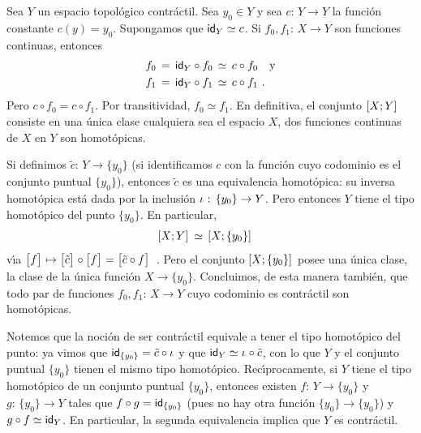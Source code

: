 \begin{obsEnContractilSonHomotopicos}\label{obs:encontractilsonhomotopicos}
	Sea $Y$ un espacio topol\'{o}gico contr\'{a}ctil. Sea $y_{0}\in Y$
	y sea $c:\,Y\rightarrow Y$ la funci\'{o}n constante $c(y)=y_{0}$.
	Supongamos que $\id[Y]\simeq c$. Si $f_{0},f_{1}:\,X\rightarrow Y$
	son funciones continuas, entonces
	\begin{align*}
		f_{0} & \,=\,\id[Y]\circ f_{0} \,\simeq\,c\circ f_{0}
			\quad\text{y} \\
		f_{1} & \,=\,\id[Y]\circ f_{1} \,\simeq\,c\circ f_{1}
		\text{ .}
	\end{align*}
	Pero $c\circ f_{0}=c\circ f_{1}$. Por transitividad,
	$f_{0}\simeq f_{1}$. En definitiva, el conjunto $\homotopicas{X}{Y}$
	consiste en una \'{u}nica clase cualquiera sea el espacio $X$, dos
	funciones continuas de $X$ en $Y$ son homot\'{o}picas.

	Si definimos $\tilde{c}:\,Y\rightarrow \{y_{0}\}$ (si identificamos $c$
	con la funci\'{o}n cuyo codominio es el conjunto puntual $\{y_{0}\}$),
	entonces $\tilde{c}$ es una equivalencia homot\'{o}pica: su inversa
	homot\'{o}pica est\'{a} dada por la inclusi\'{o}n
	$\inc:\,\{y_{0}\}\rightarrow Y$. Pero entonces $Y$ tiene el tipo
	homot\'{o}pico del punto $\{y_{0}\}$. En particular,
	\begin{align*}
		\homotopicas{X}{Y} & \,\simeq\,\homotopicas{X}{\{y_{0}\}}
	\end{align*}
	v\'{\i}a
	\begin{math}
		\clase{f}\mapsto
			\clase{\tilde{c}}\circ\clase{f}=
			\clase{\tilde{c}\circ f}
	\end{math}~.
	Pero el conjunto $\homotopicas{X}{\{y_{0}\}}$ posee una \'{u}nica
	clase, la clase de la \'{u}nica funci\'{o}n $X\rightarrow \{y_{0}\}$.
	Concluimos, de esta manera tambi\'{e}n, que todo par de funciones
	$f_{0},f_{1}:\,X\rightarrow Y$ cuyo codominio es contr\'{a}ctil son
	homot\'{o}picas.

	Notemos que la noci\'{o}n de ser contr\'{a}ctil equivale a tener el
	tipo homot\'{o}pico del punto: ya vimos que
	$\id[\{y_{0}\}]=\tilde{c}\circ\inc$ y que
	$\id[Y]\simeq\inc\circ\tilde{c}$, con lo que $Y$ y el conjunto puntual
	$\{y_{0}\}$ tienen el mismo tipo homot\'{o}pico. Rec\'{\i}procamente,
	si $Y$ tiene el tipo homot\'{o}pico de un conjunto puntual $\{y_{0}\}$,
	entonces existen $f:\,Y\rightarrow \{y_{0}\}$ y
	$g:\,\{y_{0}\}\rightarrow Y$ tales que $f\circ g=\id[\{y_{0}\}]$
	(pues no hay otra funci\'{o}n $\{y_{0}\}\rightarrow\{y_{0}\}$) y
	$g\circ f\simeq\id[Y]$. En particular, la segunda equivalencia
	implica que $Y$ es contr\'{a}ctil.
\end{obsEnContractilSonHomotopicos}

